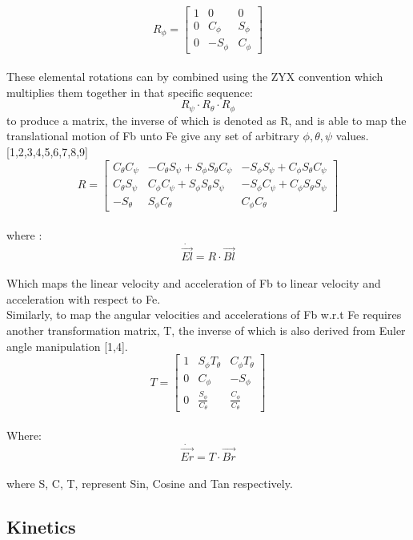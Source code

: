 \documentclass[12pt,a4paper,twoside]{report}
\begin{document}
				\\
				$$
				R_\phi = 
				\begin{bmatrix}
					1 & 0 & 0 \\
					0 & C_\phi & S_\phi  \\
					0 & -S_\phi & C_\phi
				\end{bmatrix}
				$$
				\\
				These elemental rotations can by combined using the ZYX convention which multiplies them together in that specific sequence:
				\[R_\psi \cdot R_\theta \cdot R_\phi\]
				to produce a matrix, the inverse of which is denoted as R, and is able to map the translational motion of Fb unto Fe give any set of arbitrary \(\phi, \theta, \psi\) values. [1,2,3,4,5,6,7,8,9]
				\\
				$$
				R = 
				\begin{bmatrix}
					C_\theta C_\psi & -C_\theta S_\psi + S_\phi S_\theta C_\psi & -S_\phi S_\psi + C_\phi S_\theta C_\psi \\
					C_\theta S_\psi &  C_\phi C_\psi + S_\phi S_\theta S_\psi   & -S_\phi C_\psi + C_\phi S_\theta S_\psi \\
					-S_\theta       &  S_\phi C_\theta                          &  C_\phi C_\theta
				\end{bmatrix}
				$$
				\\
				where : 
				\[ \dot{\vec{El}} = R \cdot \vec{Bl} \]
				\\
				Which maps the linear velocity and acceleration of Fb to linear velocity and acceleration with respect to Fe.
				\\
				Similarly, to map the angular velocities and accelerations of Fb w.r.t Fe requires another transformation matrix, T, the inverse of which is also derived from Euler angle manipulation [1,4]. 
				\\
				$$
				T = 
				\begin{bmatrix}
					1 & S_\phi T_\theta & C_\phi T_\theta \\
					0 & C_\phi & -S_\phi\\
					0 & \frac{S_\phi}{C_\theta}  & \frac{C_\phi}{C_\theta}
				\end{bmatrix}
				$$ 
				\\
				Where:
				\\
				\[\dot{\vec{Er}} = T \cdot \vec{Br} \]
				\\
				where S, C, T, represent Sin, Cosine and Tan respectively.
				
			\subsection{Kinetics}
			
\end{document}
